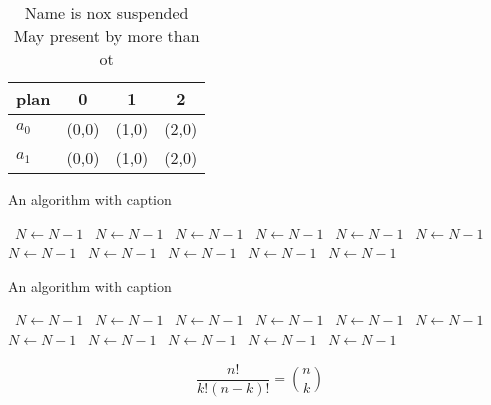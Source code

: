 \documentclass[a4paper]{article}
\begin{document}
\begin{table}
\begin{adjustbox}{width=0.6\columnwidth}
\begin{tabular}{|l|l|l|l|}
\hline
\textbf{plan} & \multicolumn{1}{c|}{\textbf{0}} & \multicolumn{1}{c|}{\textbf{1}} & \multicolumn{1}{c|}{\textbf{2}} \\ \hline
\textbf{$a_0$}  & (0,0) & (1,0) & (2,0) \\ \hline
\textbf{$a_1$}  & (0,0) & (1,0) & (2,0) \\ \hline
\end{tabular}
\end{adjustbox}
\caption{Name is nox suspended May present by more than ot
}
\end{table}

\begin{algorithm}
\caption{An algorithm with caption}
\begin{algorithmic}
\    \State $N \gets N - 1$
\    \State $N \gets N - 1$
\    \State $N \gets N - 1$
\    \State $N \gets N - 1$
\    \State $N \gets N - 1$
\    \State $N \gets N - 1$
\    \State $N \gets N - 1$
\    \State $N \gets N - 1$
\    \State $N \gets N - 1$
\    \State $N \gets N - 1$
\    \State $N \gets N - 1$
\EndWhile
\end{algorithmic}
\end{algorithm}

\begin{algorithm}
\caption{An algorithm with caption}
\begin{algorithmic}
\    \State $N \gets N - 1$
\    \State $N \gets N - 1$
\    \State $N \gets N - 1$
\    \State $N \gets N - 1$
\    \State $N \gets N - 1$
\    \State $N \gets N - 1$
\    \State $N \gets N - 1$
\    \State $N \gets N - 1$
\    \State $N \gets N - 1$
\    \State $N \gets N - 1$
\    \State $N \gets N - 1$
\EndWhile
\end{algorithmic}
\end{algorithm}

\[ \frac{n!}{k!(n-k)!} = \binom{n}{k} \]
\end{document}
